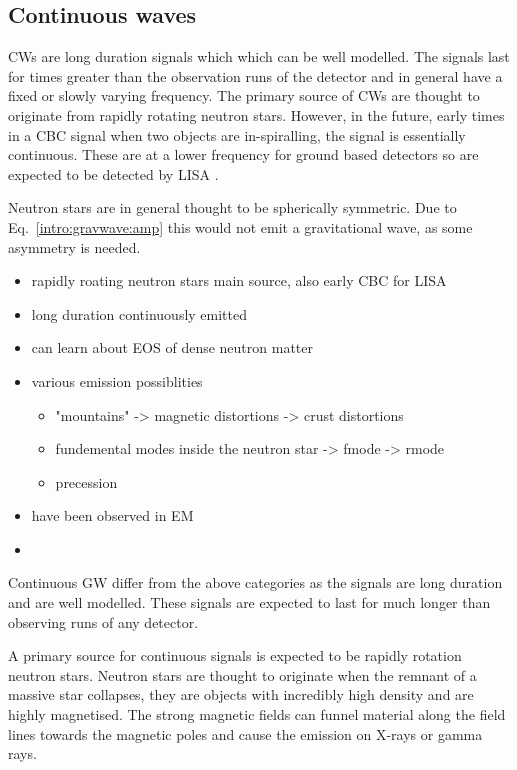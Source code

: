 \subsection{Continuous waves}


\acp{CW} are long duration signals which which can be well modelled.
The signals last for times greater than the observation runs of the detector and in general have a fixed or slowly varying frequency.
The primary source of \acp{CW} are thought to originate from rapidly rotating neutron stars. 
However, in the future, early times in a \ac{CBC} signal when two objects are in-spiralling, the signal is essentially continuous.
These are at a lower frequency for ground based detectors so are expected to be detected by \ac{LISA} \citep{}.

Neutron stars are in general thought to be spherically symmetric.
Due to Eq.~\ref{intro:gravwave:amp} this would not emit a gravitational wave, as some asymmetry is needed. 


\begin{itemize}
    \item rapidly roating neutron stars main source, also early CBC for LISA
    \item long duration continuously emitted
    \item can learn about EOS of dense neutron matter
    \item various emission possiblities
    \begin{itemize}
        \item "mountains" -> magnetic distortions -> crust distortions
        \item fundemental modes inside the neutron star -> fmode -> rmode
        \item precession
    \end{itemize}
    \item have been observed in EM
    \item 
\end{itemize}

Continuous \ac{GW} differ from the above categories as the signals are long duration and are well modelled.
These signals are expected to last for much longer than observing runs of any detector. 

A primary source for continuous signals is expected to be rapidly rotation neutron stars.
Neutron stars are thought to originate when the remnant of a massive star collapses, they are objects with incredibly high density and are highly magnetised.
The strong magnetic fields can funnel material along the field lines towards the magnetic poles and cause the emission on X-rays or gamma rays.


